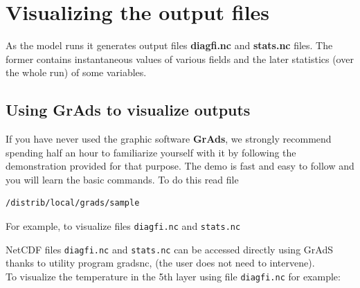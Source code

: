 \section{Visualizing the output files}

As the model runs it generates output files {\bf diagfi.nc} and
{\bf stats.nc} files. The former contains instantaneous values of
various fields and the later statistics (over the whole run) of some
variables.

\subsection{Using GrAds to visualize outputs}
If you have never used the graphic software {\bf GrAds}, we strongly
recommend spending half an hour to familiarize yourself with it by following
the demonstration provided for that purpose.
The demo is fast and easy to follow and you will learn the basic commands.
To do this read file
\begin{verbatim}
/distrib/local/grads/sample
\end{verbatim}

For example, to visualize files {\tt diagfi.nc} and {\tt stats.nc}

NetCDF files {\tt diagfi.nc} and {\tt stats.nc} can be accessed directly
using GrAdS thanks to utility program gradsnc,
(the user does not need to intervene).\\

\noindent
To visualize the temperature in the 5th layer using file
{\tt diagfi.nc} for example:
\label{loc:visu}

